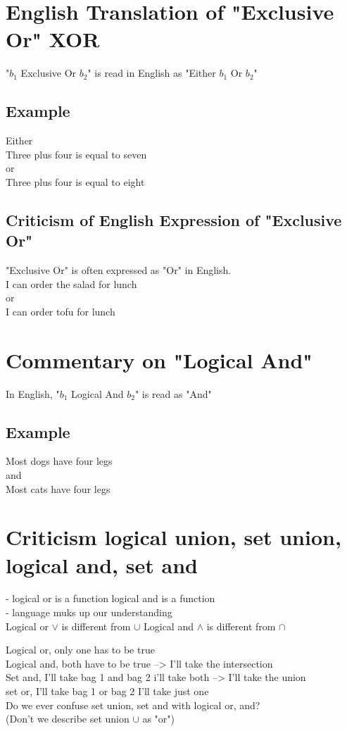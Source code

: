 \documentclass[11pt]{article}
\begin{document}
\section{English Translation of "Exclusive Or" XOR}
"$b_1$ Exclusive Or $b_2$" is read in English as "Either $b_1$ Or $b_2$"
\subsection{Example}
Either\\
Three plus four is equal to seven\\
or\\
Three plus four is equal to eight
\subsection{Criticism of English Expression of "Exclusive Or"}
"Exclusive Or" is often expressed as "Or" in English.\\
I can order the salad for lunch\\
or\\
I can order tofu for lunch

\section{Commentary on "Logical And"}
In English, "$b_1$ Logical And $b_2$" is read as "And"
\subsection{Example}
Most dogs have four legs\\
and\\
Most cats have four legs


\section{Criticism logical union, set union, logical and, set and}
- logical or is a function logical and is a function\\
- language muks up our understanding\\

Logical or $\lor$ is different from $\cup$
Logical and $\land$ is different from $\cap$

Logical or, only one has to be true\\
Logical and, both have to be true --> I'll take the intersection\\

Set and, I'll take bag 1 and bag 2 i'll take both --> I'll take the union\\
set or, I'll take bag 1 or bag 2 I'll take just one\\

Do we ever confuse set union, set and with logical or, and?\\
(Don't we describe set union $\cup$ as "or")
\end{document}
